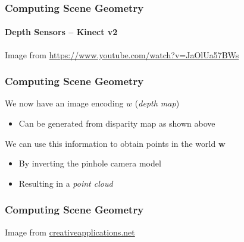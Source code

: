 \documentclass[xetex,professionalfont]{beamer}
\renewcommand{\vec}[1]{\ensuremath{\mathbf{#1}}}
\newcommand{\vw}{\vec{w}}
\begin{document}

\begin{frame}
\frametitle{Computing Scene Geometry}
\framesubtitle{Depth Sensors -- Kinect v2}

\begin{center}
    {\centering Image from \url{https://www.youtube.com/watch?v=JaOlUa57BWs}}
\end{center}

\end{frame}


\begin{frame}
\frametitle{Computing Scene Geometry}

We now have an image encoding $w$ (\emph{depth map})
\begin{itemize}
    \item Can be generated from disparity map as shown above
\end{itemize}

\bigskip
We can use this information to obtain points in the world $\vw$
\begin{itemize}
    \item By inverting the pinhole camera model
    \item Resulting in a \emph{point cloud}
\end{itemize}

\end{frame}


\begin{frame}
\frametitle{Computing Scene Geometry}

\begin{center}
    {\centering Image from \url{creativeapplications.net}}
\end{center}

\end{frame}
\end{document}
